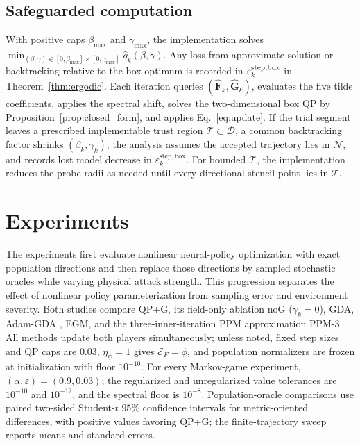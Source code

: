 \documentclass[journal]{IEEEtran}
\theoremstyle{remark}
\newcommand{\cD}{\mathcal{D}}
\newcommand{\cN}{\mathcal{N}}
\newcommand{\hatF}{\widehat{\boldsymbol{F}}}
\newcommand{\hatG}{\widehat{\boldsymbol{G}}}
\newcommand{\cE}{\mathcal{E}}
\begin{document}
	\subsection{Safeguarded computation}\label{subsec:safeguard}
	With positive caps $\beta_{\max}$ and $\gamma_{\max}$, the implementation solves $\min_{(\beta,\gamma)\in[0,\beta_{\max}]\times[0,\gamma_{\max}]}\hat q_{k}(\beta,\gamma)$.
	Any loss from approximate solution or backtracking relative to the box optimum is recorded in $\varepsilon_k^{\rm step,box}$ in Theorem~\ref{thm:ergodic}.
	Each iteration queries $(\hatF_k,\hatG_k)$, evaluates the five tilde coefficients, applies the spectral shift, solves the two-dimensional box QP by Proposition~\ref{prop:closed_form}, and applies Eq.~\eqref{eq:update}.
	If the trial segment leaves a prescribed implementable trust region $\mathcal T\subset\cD$, a common backtracking factor shrinks $(\beta_k,\gamma_k)$; the analysis assumes the accepted trajectory lies in $\cN$, and records lost model decrease in $\varepsilon_k^{\mathrm{step,box}}$.
	For bounded $\mathcal T$, the implementation reduces the probe radii as needed until every directional-stencil point lies in $\mathcal T$.
	
	\section{Experiments}\label{sec:experiments}
	
	The experiments first evaluate nonlinear neural-policy optimization with exact population directions and then replace those directions by sampled stochastic oracles while varying physical attack strength.
	This progression separates the effect of nonlinear policy parameterization from sampling error and environment severity.
	Both studies compare QP+G, its field-only ablation noG ($\gamma_k=0$), GDA, Adam-GDA \cite{KingmaBa2015Adam}, EGM, and the three-inner-iteration PPM approximation PPM-3.
	All methods update both players simultaneously; unless noted, fixed step sizes and QP caps are $0.03$, $\eta_\psi=1$ gives $\cE_F=\phi$, and population normalizers are frozen at initialization with floor $10^{-10}$.
	For every Markov-game experiment, $(\alpha,\varepsilon)=(0.9,0.03)$; the regularized and unregularized value tolerances are $10^{-10}$ and $10^{-12}$, and the spectral floor is $10^{-8}$.
	Population-oracle comparisons use paired two-sided Student-$t$ $95\%$ confidence intervals for metric-oriented differences, with positive values favoring QP+G; the finite-trajectory sweep reports means and standard errors.
	
\end{document}
